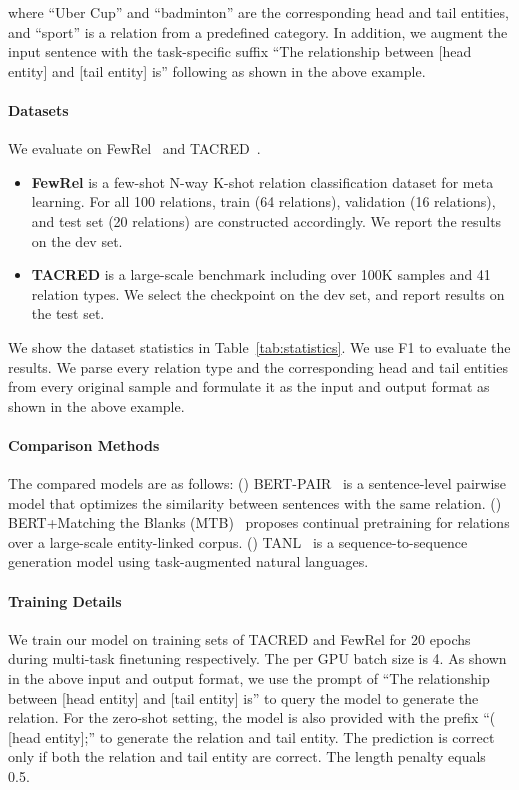 \noindent where ``Uber Cup'' and ``badminton'' are the corresponding head and tail entities, and ``sport'' is a relation from a predefined category. In addition, we augment the input sentence with the task-specific suffix ``The relationship between [head entity] and [tail entity] is'' following \cite{paolini2021structured} as shown in the above example.

\paragraph{Datasets} We evaluate on FewRel~\cite{han2018fewrel} and TACRED~\cite{zhang2017tacred}. 
\begin{itemize}
    \item {\bf FewRel} is a few-shot N-way K-shot relation classification dataset for meta learning. For all 100 relations, train (64 relations), validation (16 relations), and test set (20 relations) are constructed accordingly. We report the results on the dev set.
    \item {\bf TACRED} is a large-scale benchmark including over 100K samples and 41 relation types. We select the checkpoint on the dev set, and report results on the test set.
\end{itemize}
We show the dataset statistics in Table~\ref{tab:statistics}. 
We use F1 to evaluate the results. We parse every relation type and the corresponding head and tail entities from every original sample and formulate it as the input and output format as shown in the above example.

\paragraph{Comparison Methods} The compared models are as follows: (\expandafter{}) BERT-PAIR~\cite{gao2019fewrel} is a sentence-level pairwise model that optimizes the similarity between sentences with the same relation. (\expandafter{}) BERT+Matching the Blanks (MTB)~\cite{soares2019matching} proposes continual pretraining for relations over a large-scale entity-linked corpus. (\expandafter{}) TANL~\cite{paolini2021structured} is a sequence-to-sequence generation model using task-augmented natural languages.  

\paragraph{Training Details} 
We train our model on training sets of TACRED and FewRel for 20 epochs during multi-task finetuning respectively. The per GPU batch size is 4. As shown in the above input and output format, we use the prompt of ``The relationship between [head entity] and [tail entity] is'' to query the model to generate the relation. For the zero-shot setting, the model is also provided with the prefix ``( [head entity];'' to generate the relation and tail entity. The prediction is correct only if both the relation and tail entity are correct. The length penalty equals 0.5.

